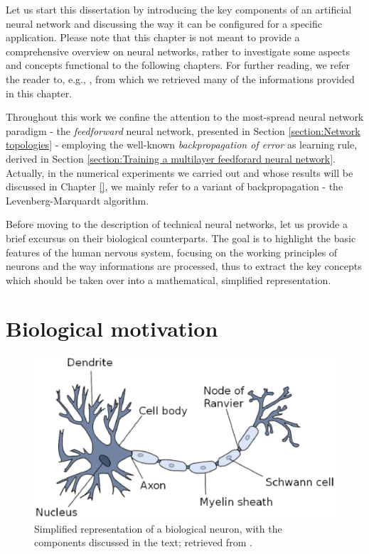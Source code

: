 \documentclass[12pt, a4paper, twoside, openright]{report}
\numberwithin{equation}{chapter}
\theoremstyle{theorem}
\theoremstyle{definition}
\theoremstyle{remark}
\theoremstyle{proposition}
\numberwithin{figure}{chapter}
\begin{document}
	
		Let us start this dissertation by introducing the key components of an artificial neural network and discussing the way it can be configured for a specific application. Please note that this chapter is not meant to provide a comprehensive overview on neural networks, rather to investigate some aspects and concepts functional to the following chapters. For further reading, we refer the reader to, e.g., \cite{Hag14, Hay05, Kri}, from which we retrieved many of the informations provided in this chapter.
		
		Throughout this work we confine the attention to the most-spread neural network paradigm - the \emph{feedforward} neural network, presented in Section \ref{section:Network topologies} - employing the well-known \emph{backpropagation of error} as learning rule, derived in Section \ref{section:Training a multilayer feedforard neural network}. Actually, in the numerical experiments we carried out and whose results will be discussed in Chapter \ref{}, we mainly refer to a variant of backpropagation - the Levenberg-Marquardt algorithm.
		
		Before moving to the description of technical neural networks, let us provide a brief excursus on their biological counterparts. The goal is to highlight the basic features of the human nervous system, focusing on the working principles of neurons and the way informations are processed, thus to extract the key concepts which should be taken over into a mathematical, simplified representation.
		
	\vspace*{0.3cm} 
		
	\section{Biological motivation}
	\label{section:Biological motivation} 
	
		\begin{figure}[t]
			\center
			\includegraphics[scale = 0.5]{neuron.eps}
			
			\caption{Simplified representation of a biological neuron, with the components discussed in the text; retrieved from \cite{Kri}.}
			\label{fig:neuron}
		\end{figure}
		
\end{document}
